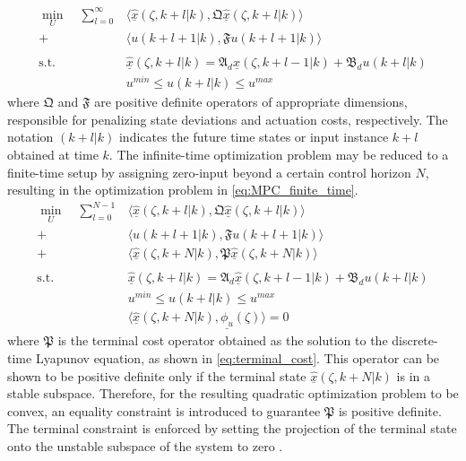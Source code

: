 \begin{equation} \label{eq:MPC_inf_time}
    \begin{aligned}
        \min_{U} \quad \sum_{l=0}^{\infty} &\langle \underline{\hat{x}}(\zeta, k+l | k), \mathfrak{Q} \underline{\hat{x}}(\zeta, k+l | k) \rangle \\
        + &\langle u(k+l+1 | k), \mathfrak{F} u(k+l+1|k) \rangle \\
        \, \\
        \text{s.t.} \quad &\underline{\hat{x}}(\zeta, k+l | k) = \mathfrak{A}_d \underline{\hat{x}}(\zeta, k+l-1 | k) + \mathfrak{B}_d u(k+l | k) \\
        &u^{min} \leq u(k+l | k) \leq u^{max}
    \end{aligned}
\end{equation}
where $\mathfrak{Q}$ and $\mathfrak{F}$ are positive definite operators of appropriate dimensions, responsible for penalizing state deviations and actuation costs, respectively. The notation $(k+l|k)$ indicates the future time states or input instance $k+l$ obtained at time $k$. The infinite-time optimization problem may be reduced to a finite-time setup by assigning zero-input beyond a certain control horizon $N$, resulting in the optimization problem in \eqref{eq:MPC_finite_time}.
\begin{equation} \label{eq:MPC_finite_time}
    \begin{aligned}
        \min_{U} \quad \sum_{l=0}^{N-1} &\langle \underline{\hat{x}}(\zeta, k+l | k), \mathfrak{Q} \underline{\hat{x}}(\zeta, k+l | k) \rangle \\
        + &\langle u(k+l+1 | k), \mathfrak{F} u(k+l+1|k) \rangle \\
        + &\langle \underline{\hat{x}}(\zeta, k+N | k), \mathfrak{P} \underline{\hat{x}}(\zeta, k+N | k) \rangle \\
        \, \\
        \text{s.t.} \quad &\underline{\hat{x}}(\zeta, k+l | k) = \mathfrak{A}_d \underline{\hat{x}}(\zeta, k+l-1 | k) + \mathfrak{B}_d u(k+l | k) \\
        &u^{min} \leq u(k+l | k) \leq u^{max} \\
        & \langle \underline{\hat{x}}(\zeta, k+N | k), \underline{\phi_u}(\zeta) \rangle = 0
    \end{aligned}
\end{equation}
where $\mathfrak{P}$ is the terminal cost operator obtained as the solution to the discrete-time Lyapunov equation, as shown in \eqref{eq:terminal_cost}. This operator can be shown to be positive definite only if the terminal state $\underline{\hat{x}}(\zeta, k+N | k)$ is in a stable subspace. Therefore, for the resulting quadratic optimization problem to be convex, an equality constraint is introduced to guarantee $\mathfrak{P}$ is positive definite. The terminal constraint is enforced by setting the projection of the terminal state onto the unstable subspace of the system to zero \cite{curtainbook, xu2017linear,Khatibi2021Model}.
